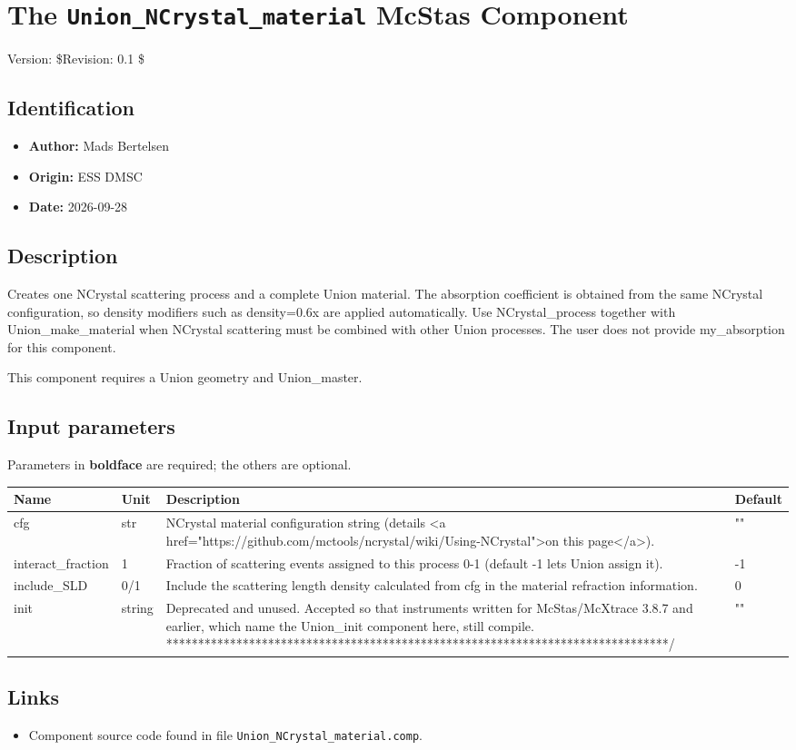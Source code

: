 \section{The \texttt{Union\_NCrystal\_material} McStas Component}
Version: \$Revision: 0.1 \$

\subsection*{Identification}
\begin{itemize}
  \item \textbf{Author:} Mads Bertelsen
  \item \textbf{Origin:} ESS DMSC
  \item \textbf{Date:} 2026-09-28
\end{itemize}

\subsection*{Description}
Creates one NCrystal scattering process and a complete Union material. The absorption coefficient is obtained from the same NCrystal configuration, so density modifiers such as density=0.6x are applied automatically. Use NCrystal\_process together with Union\_make\_material when NCrystal scattering must be combined with other Union processes. The user does not provide my\_absorption for this component.

This component requires a Union geometry and Union\_master.

\subsection*{Input parameters}
Parameters in \textbf{boldface} are required; the others are optional.

\begin{longtable}{p{}p{}p{}p{}}
\toprule
\textbf{Name} & \textbf{Unit} & \textbf{Description} & \textbf{Default} \\
\midrule
\endhead
cfg & str & NCrystal material configuration string (details \textless{}a href="https://github.com/mctools/ncrystal/wiki/Using-NCrystal"\textgreater{}on this page\textless{}/a\textgreater{}). & "" \\
interact\_fraction & 1 & Fraction of scattering events assigned to this process 0-1 (default -1 lets Union assign it). & -1 \\
include\_SLD & 0/1 & Include the scattering length density calculated from cfg in the material refraction information. & 0 \\
init & string & Deprecated and unused. Accepted so that instruments written for McStas/McXtrace 3.8.7 and earlier, which name the Union\_init component here, still compile. *******************************************************************************/ & "" \\
\bottomrule
\end{longtable}

\subsection*{Links}
\begin{itemize}
  \item Component source code found in file \texttt{Union\_NCrystal\_material.comp}.
\end{itemize}
